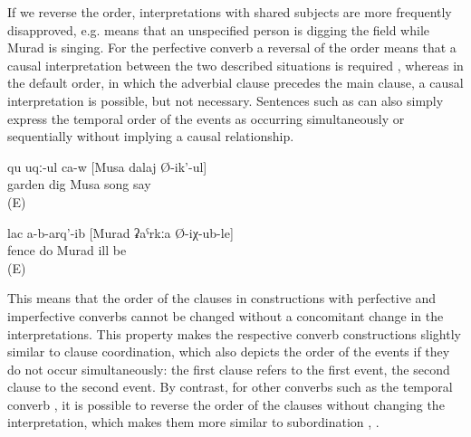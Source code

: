 If we reverse the order, interpretations with shared subjects are more frequently disapproved, e.g.  means that an unspecified person is digging the field while Murad is singing. For the perfective converb a reversal of the order means that a causal interpretation between the two described situations is required , whereas in the default order, in which the adverbial clause precedes the main clause, a causal interpretation is possible, but not necessary. Sentences such as  can also simply express the temporal order of the events as occurring simultaneously or sequentially without implying a causal relationship.
%
\begin{exe}
	\ex	\label{ex:‎‎‎(He) is digging the field while Musa is singing}
	\gll	qu	uqː-ul	ca-w	[Musa	dalaj	Ø-ik'-ul]\\
		garden	dig		Musa	song	say\\
	\glt	{} (E)

	\ex	\label{ex:Because Murad got ill, he (= Murad or another person) did not build the fence2}
	\gll	lac	a-b-arq'-ib	[Murad	ʡaˁrkːa	Ø-iχ-ub-le]\\
		fence	do	Murad	ill	be\\
	\glt	{} (E)
\end{exe}

This means that the order of the clauses in constructions with perfective and imperfective converbs cannot be changed without a concomitant change in the interpretations. This property makes the respective converb constructions slightly similar to clause coordination, which also depicts the order of the events if they do not occur simultaneously: the first clause refers to the first event, the second clause to the second event. By contrast, for other converbs such as the temporal converb , it is possible to reverse the order of the clauses without changing the interpretation, which makes them more similar to subordination , .


